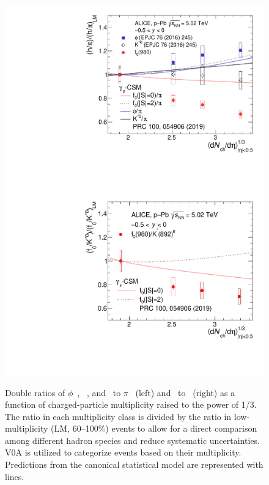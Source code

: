 \begin{figure}[!hbt]
	\centering
	\includegraphics[width=0.49 \textwidth]{figures/Fig4_DR_pion.pdf} 
        \includegraphics[width=0.49 \textwidth]{figures/Fig5_DR_Kstar.pdf} 
	\caption{ Double ratios of $\phi$~\cite{ALICE:2016sak}, \kstar~\cite{ALICE:2016sak}, and \fzero~to $\pi$~\cite{ALICE:2016dei} (left) and \fzero~to \kstar~(right) as a function of charged-particle multiplicity raised to the power of 1/3. The ratio in each multiplicity class is divided by the ratio in low-multiplicity (LM, 60--100\%) events to allow for a direct comparison among different hadron species and reduce systematic uncertainties. V0A is utilized to categorize events based on their multiplicity. Predictions from the canonical statistical model are represented with lines. }
	\label{fig:f0piAddCSM}
\end{figure}

